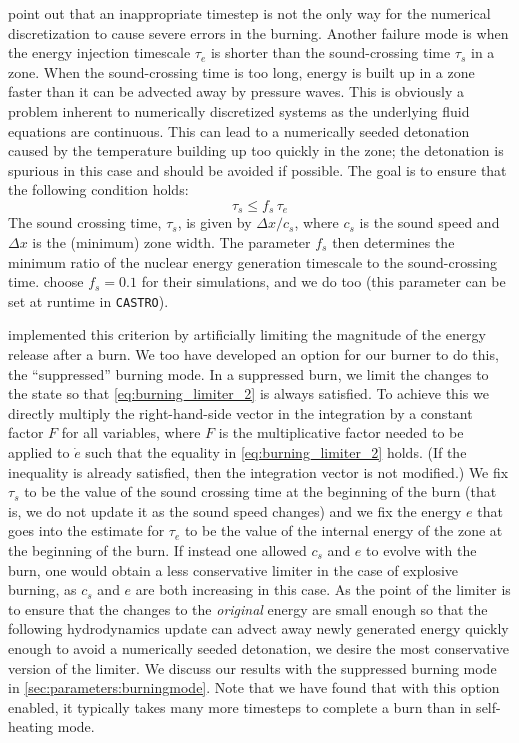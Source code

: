 \documentclass[twocolumn,numberedappendix]{../aastex6}
\newcommand{\castro}{\texttt{CASTRO}}
\begin{document}
\citet{kushnir:2013} point out that an inappropriate timestep is 
not the only way for the numerical discretization to cause 
severe errors in the burning. Another failure mode is when
the energy injection timescale
$\tau_e$ is shorter than the sound-crossing time $\tau_s$ in a zone.
When the sound-crossing time is too long, energy is built up in
a zone faster than it can be advected away by pressure waves.
This is obviously a problem inherent to numerically discretized
systems as the underlying fluid equations are continuous.
This can lead to a numerically seeded detonation caused by the
temperature building up too quickly in the zone; the detonation
is spurious in this case and should be avoided if possible.
The goal is to ensure that the following condition holds:
\begin{equation}
  \tau_s \leq f_{s}\, \tau_e \label{eq:burning_limiter_2}
\end{equation}
The sound crossing time, $\tau_s$, is given by $\Delta x / c_s$, 
where $c_s$ is the sound speed and $\Delta x$ is the (minimum) 
zone width. The parameter $f_{s}$ then determines the minimum
ratio of the nuclear energy generation timescale to the 
sound-crossing time. \citet{kushnir:2013} choose $f_{s} = 0.1$ 
for their simulations, and we do too (this parameter can be set 
at runtime in \castro).

\citet{kushnir:2013} implemented this criterion by artificially 
limiting the magnitude of the energy release after a burn. We
too have developed an option for our burner to do this,
the ``suppressed'' burning mode. In a suppressed burn, we limit
the changes to the state so that \autoref{eq:burning_limiter_2}
is always satisfied. To achieve this we directly multiply the
right-hand-side vector in the integration by a constant factor $F$
for all variables, where $F$ is the multiplicative factor needed to
be applied to $\dot{e}$ such that the equality in \autoref{eq:burning_limiter_2}
holds. (If the inequality is already satisfied, then the integration
vector is not modified.) We fix $\tau_s$ to be the value of the sound
crossing time at the beginning of the burn (that is, we do not
update it as the sound speed changes) and we fix the energy $e$
that goes into the estimate for $\tau_e$ to be the value of the
internal energy of the zone at the beginning of the burn. If
instead one allowed $c_s$ and $e$ to evolve with the burn, one
would obtain a less conservative limiter in the case of explosive
burning, as $c_s$ and $e$ are both increasing in this case.
As the point of the limiter is to ensure that the changes to the
\textit{original} energy are small enough so that the following
hydrodynamics update can advect away newly generated energy
quickly enough to avoid a numerically seeded detonation,
we desire the most conservative version of the limiter. We discuss
our results with the suppressed burning mode in \autoref{sec:parameters:burningmode}.
Note that we have found that with this option enabled, it typically takes
many more timesteps to complete a burn than in self-heating mode.
\end{document}
